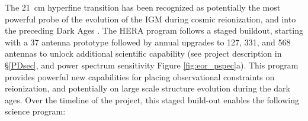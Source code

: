 \documentclass[preprint]{aastex}
\begin{document}
The 21~cm hyperfine transition has been recognized as potentially the most
powerful probe of the evolution of the IGM during cosmic reionization, and into
the preceding Dark Ages \citep{morales_wyithe2010,furlanetto_et_al2006}.  The
HERA program follows a staged buildout, starting with a 37 antenna prototype
followed by annual upgrades to 127, 331, and 568 antennas to unlock additional
scientific capability (see project description in \S \ref{PDsec}, and power
spectrum sensitivity Figure \ref{fig:eor_pspec}a).  This program 
provides powerful new capabilities for placing observational constraints
on reionization, and potentially on large scale structure
evolution during the dark ages.
Over the timeline of the project, this staged build-out enables the following science program:
\end{document}
